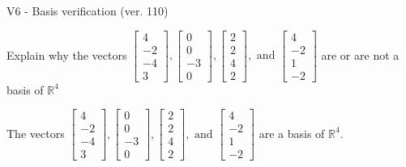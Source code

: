 \begin{exercise}
  \begin{exerciseTitle}V6 - Basis verification (ver. 110)\end{exerciseTitle}
  \begin{exerciseStatement}
    Explain why the vectors \(\left[\begin{array}{r}
4 \\
-2 \\
-4 \\
3
\end{array}\right] , \left[\begin{array}{r}
0 \\
0 \\
-3 \\
0
\end{array}\right] , \left[\begin{array}{r}
2 \\
2 \\
4 \\
2
\end{array}\right] , \text{ and } \left[\begin{array}{r}
4 \\
-2 \\
1 \\
-2
\end{array}\right]\) are or are not a basis of \(\mathbb{R}^4\)	


  \end{exerciseStatement}
  \begin{exerciseAnswer}
   The vectors \(\left[\begin{array}{r}
4 \\
-2 \\
-4 \\
3
\end{array}\right] , \left[\begin{array}{r}
0 \\
0 \\
-3 \\
0
\end{array}\right] , \left[\begin{array}{r}
2 \\
2 \\
4 \\
2
\end{array}\right] , \text{ and } \left[\begin{array}{r}
4 \\
-2 \\
1 \\
-2
\end{array}\right]\) 
  	 are  a basis of \(\mathbb{R}^4\).
  


  \end{exerciseAnswer}
\end{exercise}